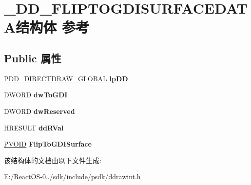 \hypertarget{struct___d_d___f_l_i_p_t_o_g_d_i_s_u_r_f_a_c_e_d_a_t_a}{}\section{\+\_\+\+D\+D\+\_\+\+F\+L\+I\+P\+T\+O\+G\+D\+I\+S\+U\+R\+F\+A\+C\+E\+D\+A\+T\+A结构体 参考}
\label{struct___d_d___f_l_i_p_t_o_g_d_i_s_u_r_f_a_c_e_d_a_t_a}
\subsection*{Public 属性}
\begin{DoxyCompactItemize}
\item 
\mbox{\label{struct___d_d___f_l_i_p_t_o_g_d_i_s_u_r_f_a_c_e_d_a_t_a_a301fa36c33df47459ff65d8d447eb9ee}} 
\hyperlink{struct___d_d___d_i_r_e_c_t_d_r_a_w___g_l_o_b_a_l}{P\+D\+D\+\_\+\+D\+I\+R\+E\+C\+T\+D\+R\+A\+W\+\_\+\+G\+L\+O\+B\+AL} {\bfseries lp\+DD}
\item 
\mbox{\label{struct___d_d___f_l_i_p_t_o_g_d_i_s_u_r_f_a_c_e_d_a_t_a_aab424fb80e92a487032d6769fa5c4865}} 
D\+W\+O\+RD {\bfseries dw\+To\+G\+DI}
\item 
\mbox{\label{struct___d_d___f_l_i_p_t_o_g_d_i_s_u_r_f_a_c_e_d_a_t_a_a8652aa5eaf3d5b05fbad1d9b4195b5ac}} 
D\+W\+O\+RD {\bfseries dw\+Reserved}
\item 
\mbox{\label{struct___d_d___f_l_i_p_t_o_g_d_i_s_u_r_f_a_c_e_d_a_t_a_a51147a035c622aa789fed962b6643bee}} 
H\+R\+E\+S\+U\+LT {\bfseries dd\+R\+Val}
\item 
\mbox{\label{struct___d_d___f_l_i_p_t_o_g_d_i_s_u_r_f_a_c_e_d_a_t_a_ac4fd799426933fd1f3dd62974bb82938}} 
\hyperlink{interfacevoid}{P\+V\+O\+ID} {\bfseries Flip\+To\+G\+D\+I\+Surface}
\end{DoxyCompactItemize}


该结构体的文档由以下文件生成\+:\begin{DoxyCompactItemize}
\item 
E\+:/\+React\+O\+S-\/0../sdk/include/psdk/ddrawint.\+h\end{DoxyCompactItemize}
